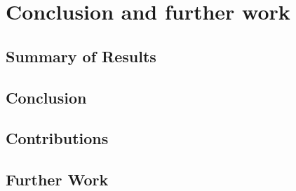 \chapter{Conclusion and further work}
\label{ch:conclusion}

\section{Summary of Results}

\section{Conclusion}

\section{Contributions}

\section{Further Work}

